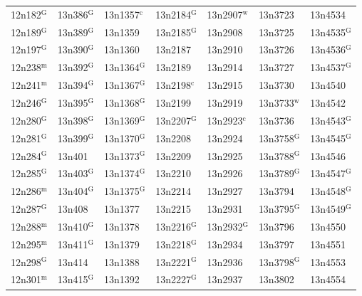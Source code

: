 \documentclass[12pt, oneside]{amsart}
\begin{document}
{\begin{longtable}{*{7}{>{\raggedright\arraybackslash}p{}}}
12n182$^{\mathrm{G}}$ & 13n386$^{\mathrm{G}}$ & 13n1357$^{\mathrm{c}}$ & 13n2184$^{\mathrm{G}}$ & 13n2907$^{\mathrm{w}}$ & 13n3723 & 13n4534 \\
12n189$^{\mathrm{G}}$ & 13n389$^{\mathrm{G}}$ & 13n1359 & 13n2185$^{\mathrm{G}}$ & 13n2908 & 13n3725 & 13n4535$^{\mathrm{G}}$ \\
12n197$^{\mathrm{G}}$ & 13n390$^{\mathrm{G}}$ & 13n1360 & 13n2187 & 13n2910 & 13n3726 & 13n4536$^{\mathrm{G}}$ \\
12n238$^{\mathrm{m}}$ & 13n392$^{\mathrm{G}}$ & 13n1364$^{\mathrm{G}}$ & 13n2189 & 13n2914 & 13n3727 & 13n4537$^{\mathrm{G}}$ \\
12n241$^{\mathrm{m}}$ & 13n394$^{\mathrm{G}}$ & 13n1367$^{\mathrm{G}}$ & 13n2198$^{\mathrm{c}}$ & 13n2915 & 13n3730 & 13n4540 \\
12n246$^{\mathrm{G}}$ & 13n395$^{\mathrm{G}}$ & 13n1368$^{\mathrm{G}}$ & 13n2199 & 13n2919 & 13n3733$^{\mathrm{w}}$ & 13n4542 \\
12n280$^{\mathrm{G}}$ & 13n398$^{\mathrm{G}}$ & 13n1369$^{\mathrm{G}}$ & 13n2207$^{\mathrm{G}}$ & 13n2923$^{\mathrm{c}}$ & 13n3736 & 13n4543$^{\mathrm{G}}$ \\
12n281$^{\mathrm{G}}$ & 13n399$^{\mathrm{G}}$ & 13n1370$^{\mathrm{G}}$ & 13n2208 & 13n2924 & 13n3758$^{\mathrm{G}}$ & 13n4545$^{\mathrm{G}}$ \\
12n284$^{\mathrm{G}}$ & 13n401 & 13n1373$^{\mathrm{G}}$ & 13n2209 & 13n2925 & 13n3788$^{\mathrm{G}}$ & 13n4546 \\
12n285$^{\mathrm{G}}$ & 13n403$^{\mathrm{G}}$ & 13n1374$^{\mathrm{G}}$ & 13n2210 & 13n2926 & 13n3789$^{\mathrm{G}}$ & 13n4547$^{\mathrm{G}}$ \\
12n286$^{\mathrm{m}}$ & 13n404$^{\mathrm{G}}$ & 13n1375$^{\mathrm{G}}$ & 13n2214 & 13n2927 & 13n3794 & 13n4548$^{\mathrm{G}}$ \\
12n287$^{\mathrm{G}}$ & 13n408 & 13n1377 & 13n2215 & 13n2931 & 13n3795$^{\mathrm{G}}$ & 13n4549$^{\mathrm{G}}$ \\
12n288$^{\mathrm{m}}$ & 13n410$^{\mathrm{G}}$ & 13n1378 & 13n2216$^{\mathrm{G}}$ & 13n2932$^{\mathrm{G}}$ & 13n3796 & 13n4550 \\
12n295$^{\mathrm{m}}$ & 13n411$^{\mathrm{G}}$ & 13n1379 & 13n2218$^{\mathrm{G}}$ & 13n2934 & 13n3797 & 13n4551 \\
12n298$^{\mathrm{G}}$ & 13n414 & 13n1388 & 13n2221$^{\mathrm{G}}$ & 13n2936 & 13n3798$^{\mathrm{G}}$ & 13n4553 \\
12n301$^{\mathrm{m}}$ & 13n415$^{\mathrm{G}}$ & 13n1392 & 13n2227$^{\mathrm{G}}$ & 13n2937 & 13n3802 & 13n4554 \\

\end{longtable}}
\end{document}
